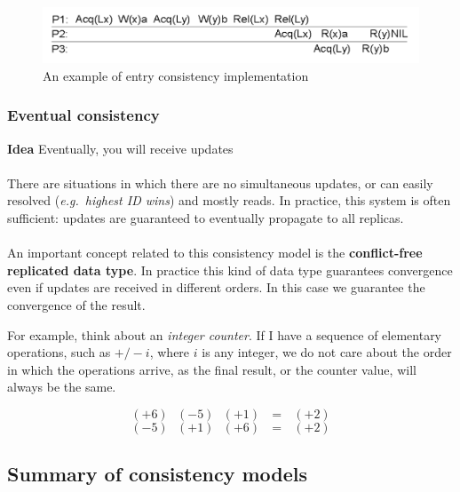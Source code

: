 \begin{figure}[htbp]
    \centering
    \includegraphics[width=\textwidth]{src/images/consistency-replication/entry-consistency.png}
    \caption{An example of entry consistency implementation}
\end{figure}

\subsubsection{Eventual consistency}

\textbf{Idea} Eventually, you will receive updates\\
\\
There are situations in which there are no simultaneous
updates, or can easily resolved (\emph{e.g.~highest ID wins}) and mostly
reads. In practice, this system is often sufficient: updates are guaranteed to
eventually propagate to all replicas.\\
\\
An important concept related to this consistency model is the \textbf{conflict-free replicated data type}.
In practice this kind of data type guarantees convergence even
if updates are received in different orders. In this case we guarantee
the convergence of the result.

For example, think about an \emph{integer counter}. If I have a sequence of elementary operations, such as
$+/- i$, where $i$ is any integer, we do not care about the order in which the operations arrive, 
as the final result, or the counter value, will always be the same.

\begin{equation*}
    (+6) \text{   } (-5) \text{   } (+1) \text{   } = \text{   } (+2)
\end{equation*}
\begin{equation*}
    (-5) \text{   } (+1) \text{   } (+6) \text{   } = \text{   } (+2)
\end{equation*}

\subsection{Summary of consistency models}

